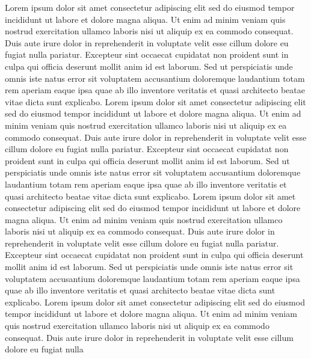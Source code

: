 Lorem ipsum dolor sit amet consectetur adipiscing elit sed do eiusmod tempor incididunt ut labore et dolore magna aliqua. Ut enim ad minim veniam quis nostrud exercitation ullamco laboris nisi ut aliquip ex ea commodo consequat. Duis aute irure dolor in reprehenderit in voluptate velit esse cillum dolore eu fugiat nulla pariatur. Excepteur sint occaecat cupidatat non proident sunt in culpa qui officia deserunt mollit anim id est laborum. Sed ut perspiciatis unde omnis iste natus error sit voluptatem accusantium doloremque laudantium totam rem aperiam eaque ipsa quae ab illo inventore veritatis et quasi architecto beatae vitae dicta sunt explicabo. Lorem ipsum dolor sit amet consectetur adipiscing elit sed do eiusmod tempor incididunt ut labore et dolore magna aliqua. Ut enim ad minim veniam quis nostrud exercitation ullamco laboris nisi ut aliquip ex ea commodo consequat. Duis aute irure dolor in reprehenderit in voluptate velit esse cillum dolore eu fugiat nulla pariatur. Excepteur sint occaecat cupidatat non proident sunt in culpa qui officia deserunt mollit anim id est laborum. Sed ut perspiciatis unde omnis iste natus error sit voluptatem accusantium doloremque laudantium totam rem aperiam eaque ipsa quae ab illo inventore veritatis et quasi architecto beatae vitae dicta sunt explicabo. Lorem ipsum dolor sit amet consectetur adipiscing elit sed do eiusmod tempor incididunt ut labore et dolore magna aliqua. Ut enim ad minim veniam quis nostrud exercitation ullamco laboris nisi ut aliquip ex ea commodo consequat. Duis aute irure dolor in reprehenderit in voluptate velit esse cillum dolore eu fugiat nulla pariatur. Excepteur sint occaecat cupidatat non proident sunt in culpa qui officia deserunt mollit anim id est laborum. Sed ut perspiciatis unde omnis iste natus error sit voluptatem accusantium doloremque laudantium totam rem aperiam eaque ipsa quae ab illo inventore veritatis et quasi architecto beatae vitae dicta sunt explicabo. Lorem ipsum dolor sit amet consectetur adipiscing elit sed do eiusmod tempor incididunt ut labore et dolore magna aliqua. Ut enim ad minim veniam quis nostrud exercitation ullamco laboris nisi ut aliquip ex ea commodo consequat. Duis aute irure dolor in reprehenderit in voluptate velit esse cillum dolore eu fugiat nulla
